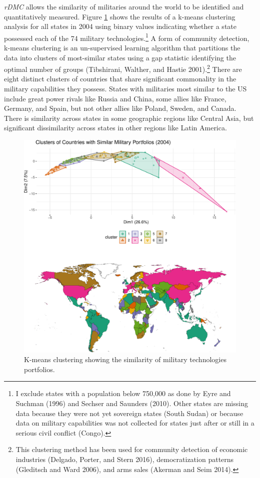 \documentclass[
]{article}
\begin{document}
\emph{rDMC} allows the similarity of militaries around the world to be identified and quantitatively measured. Figure \ref{fig:country-clusters} shows the results of a k-means clustering analysis for all states in 2004 using binary values indicating whether a state possessed each of the 74 military technologies.\footnote{I exclude states with a population below 750,000 as done by Eyre and Suchman (1996) and Sechser and Saunders (2010). Other states are missing data because they were not yet sovereign states (South Sudan) or because data on military capabilities was not collected for states just after or still in a serious civil conflict (Congo).} A form of community detection, k-means clustering is an un-supervised learning algorithm that partitions the data into clusters of most-similar states using a gap statistic identifying the optimal number of groups (Tibshirani, Walther, and Hastie 2001).\footnote{This clustering method has been used for community detection of economic industries (Delgado, Porter, and Stern 2016), democratization patterns (Gleditsch and Ward 2006), and arms sales (Akerman and Seim 2014).} There are eight distinct clusters of countries that share significant commonality in the military capabilities they possess. States with militaries most similar to the US include great power rivals like Russia and China, some allies like France, Germany, and Spain, but not other allies like Poland, Sweden, and Canada. There is similarity across states in some geographic regions like Central Asia, but significant dissimilarity across states in other regions like Latin America.

\begin{figure}
\centering
\includegraphics{figures/country-clusters-1.pdf}
\caption{\label{fig:country-clusters}K-means clustering showing the similarity of military technologies portfolios.}
\end{figure}
\end{document}
